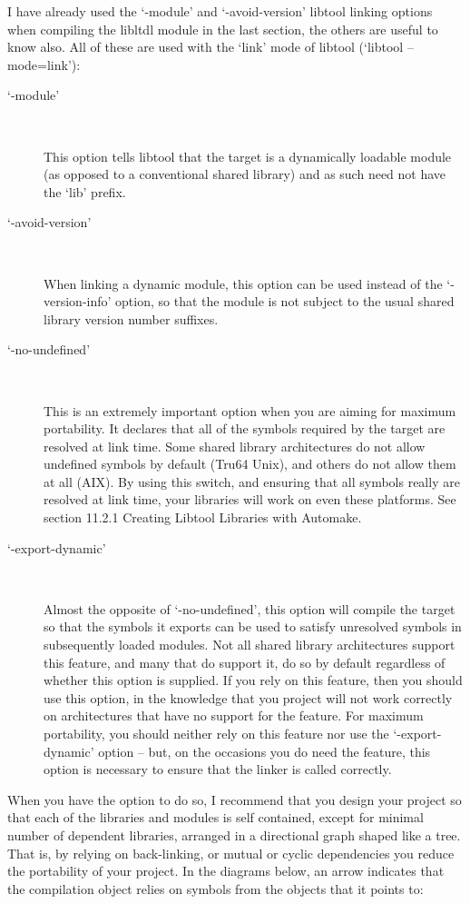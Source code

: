 I have already used the `-module' and `-avoid-version' libtool linking options when compiling the libltdl module in the last section, the others are useful to know also. All of these are used with the `link' mode of libtool (`libtool --mode=link'): 


\begin{description}
\item[`-module']
\

    This option tells libtool that the target is a dynamically loadable module (as opposed to a conventional shared library) and as such need not have the `lib' prefix.

\item[`-avoid-version']
\

    When linking a dynamic module, this option can be used instead of the `-version-info' option, so that the module is not subject to the usual shared library version number suffixes.

\item[`-no-undefined']
\

    This is an extremely important option when you are aiming for maximum portability. It declares that all of the symbols required by the target are resolved at link time. Some shared library architectures do not allow undefined symbols by default (Tru64 Unix), and others do not allow them at all (AIX). By using this switch, and ensuring that all symbols really are resolved at link time, your libraries will work on even these platforms. See section 11.2.1 Creating Libtool Libraries with Automake.

\item[`-export-dynamic']
\

    Almost the opposite of `-no-undefined', this option will compile the target so that the symbols it exports can be used to satisfy unresolved symbols in subsequently loaded modules. Not all shared library architectures support this feature, and many that do support it, do so by default regardless of whether this option is supplied. If you rely on this feature, then you should use this option, in the knowledge that you project will not work correctly on architectures that have no support for the feature. For maximum portability, you should neither rely on this feature nor use the `-export-dynamic' option -- but, on the occasions you do need the feature, this option is necessary to ensure that the linker is called correctly. 
\end{description}

When you have the option to do so, I recommend that you design your project so that each of the libraries and modules is self contained, except for minimal number of dependent libraries, arranged in a directional graph shaped like a tree. That is, by relying on back-linking, or mutual or cyclic dependencies you reduce the portability of your project. In the diagrams below, an arrow indicates that the compilation object relies on symbols from the objects that it points to:

